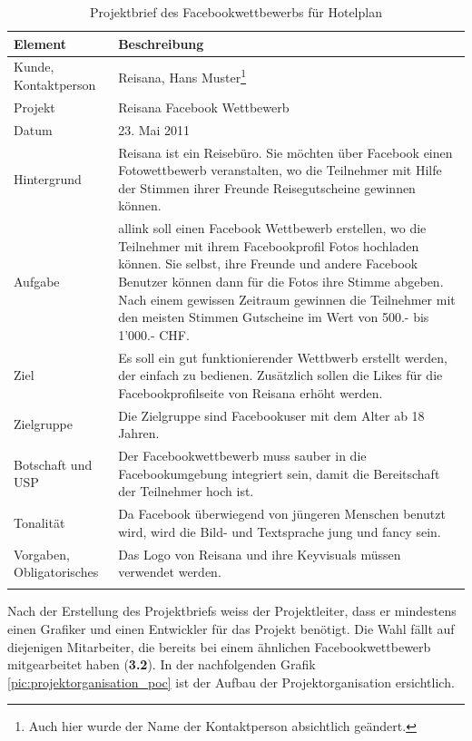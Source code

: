 \begin{longtable}{lp{10cm}}
    \toprule \textbf{Element} & \textbf{Beschreibung} \\
    \midrule Kunde, Kontaktperson &
        Reisana, Hans Muster\footnote{Auch hier wurde der Name der Kontaktperson
        absichtlich geändert.} \\
    \midrule Projekt &
        Reisana Facebook Wettbewerb \\
    \midrule Datum &
        23. Mai 2011 \\
    \midrule Hintergrund &
        Reisana ist ein Reisebüro. Sie möchten über Facebook einen Fotowettbewerb
        veranstalten, wo die Teilnehmer mit Hilfe der Stimmen ihrer Freunde 
        Reisegutscheine gewinnen können. \\
    \midrule Aufgabe &
        allink soll einen Facebook Wettbewerb erstellen, wo die Teilnehmer mit
        ihrem Facebookprofil Fotos hochladen können. Sie selbst, ihre Freunde
        und andere Facebook Benutzer können dann für die Fotos ihre Stimme abgeben.
        Nach einem gewissen Zeitraum gewinnen die Teilnehmer mit den meisten 
        Stimmen Gutscheine im Wert von 500.- bis 1'000.- CHF. \\
    \midrule Ziel &
        Es soll ein gut funktionierender Wettbwerb erstellt werden, der einfach
        zu bedienen. Zusätzlich sollen die Likes für die Facebookprofilseite von
        Reisana erhöht werden. \\
    \midrule Zielgruppe &
        Die Zielgruppe sind Facebookuser mit dem Alter ab 18 Jahren. \\
    \midrule Botschaft und USP &
        Der Facebookwettbewerb muss sauber in die Facebookumgebung integriert 
        sein, damit die Bereitschaft der Teilnehmer hoch ist. \\
    \midrule Tonalität &
        Da Facebook überwiegend von jüngeren Menschen benutzt wird, wird die
        Bild- und Textsprache jung und fancy sein. \\
    \midrule Vorgaben, Obligatorisches &
        Das Logo von Reisana und ihre Keyvisuals müssen verwendet werden. \\
    \bottomrule
    \caption[Projektbrief des Facebookwettbewerbs für Hotelplan]{Projektbrief des 
        Facebookwettbewerbs für Hotelplan\footnotemark}
    \label{tab:projektbrief_poc}
\end{longtable}

Nach der Erstellung des Projektbriefs weiss der Projektleiter, dass er mindestens
einen Grafiker und einen Entwickler für das Projekt benötigt. Die Wahl fällt
auf diejenigen Mitarbeiter, die bereits bei einem ähnlichen Facebookwettbewerb
mitgearbeitet haben (\textbf{3.2}). In der nachfolgenden Grafik \ref{pic:projektorganisation_poc} 
ist der Aufbau der Projektorganisation ersichtlich.

